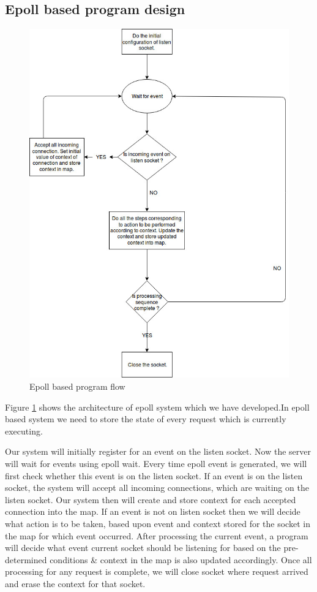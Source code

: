 \documentclass[hidelinks]{report}
\begin{document}
\begin{itemize}
\subsection*{Epoll based program design}
\begin{figure}[H]
\centering
\includegraphics[scale=0.45]{Epoll_Based_Program_Flow.jpg}
\caption{Epoll based program flow}
\label{Epollbasedprogram}
\end{figure}
Figure \ref{Epollbasedprogram} shows the architecture of epoll system which we have developed.In epoll based system we need to store the state of every request which is currently executing.

Our system will initially register for an event on the listen socket. Now the server will wait for events using epoll wait. Every time epoll event is generated, we will first check whether this event is on the listen socket. If an event is on the listen socket, the system will accept all incoming connections, which are waiting on the listen socket. Our system then will create and store context for each accepted connection into the map. If an event is not on listen socket then we will decide what action is to be taken, based upon event and context stored for the socket in the map for which event occurred. After processing the current event, a program will decide what event current socket should be listening for based on the pre-determined conditions \& context in the map is also updated accordingly.  Once all processing for any request is complete, we will close socket where request arrived and erase the context for that socket.  

\end{itemize}
\end{document}
